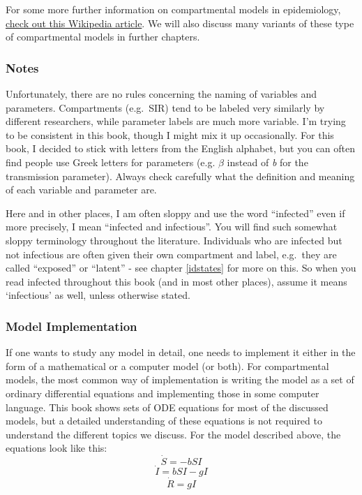 \documentclass[]{book}
\theoremstyle{definition}
\theoremstyle{definition}
\theoremstyle{definition}
\theoremstyle{remark}
\begin{document}
For some more further information on compartmental models in
epidemiology,
\href{https://en.wikipedia.org/wiki/Compartmental_models_in_epidemiology}{check
out this Wikipedia article}. We will also discuss many variants of these
type of compartmental models in further chapters.

\hypertarget{mynotebox}{%
\subsubsection{Notes}\label{mynotebox}}

Unfortunately, there are no rules concerning the naming of variables and
parameters. Compartments (e.g.~SIR) tend to be labeled very similarly by
different researchers, while parameter labels are much more variable.
I'm trying to be consistent in this book, though I might mix it up
occasionally. For this book, I decided to stick with letters from the
English alphabet, but you can often find people use Greek letters for
parameters (e.g. \(\beta\) instead of \emph{b} for the transmission
parameter). Always check carefully what the definition and meaning of
each variable and parameter are.

Here and in other places, I am often sloppy and use the word
``infected'' even if more precisely, I mean ``infected and infectious''.
You will find such somewhat sloppy terminology throughout the
literature. Individuals who are infected but not infectious are often
given their own compartment and label, e.g.~they are called ``exposed''
or ``latent'' - see chapter \ref{idstates} for more on this. So when you
read infected throughout this book (and in most other places), assume it
means `infectious' as well, unless otherwise stated.

\hypertarget{myadvancedbox}{%
\subsubsection{Model Implementation}\label{myadvancedbox}}

If one wants to study any model in detail, one needs to implement it
either in the form of a mathematical or a computer model (or both). For
compartmental models, the most common way of implementation is writing
the model as a set of ordinary differential equations and implementing
those in some computer language. This book shows sets of ODE equations
for most of the discussed models, but a detailed understanding of these
equations is not required to understand the different topics we discuss.
For the model described above, the equations look like this:
\[\dot S = -bSI\] \[\dot I = bSI - gI\] \[\dot R = gI\]
\end{document}
